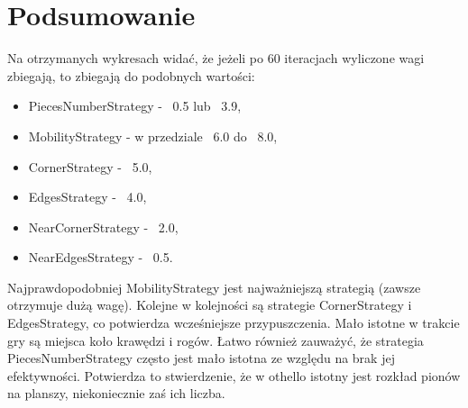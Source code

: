 \section{Podsumowanie} 

Na otrzymanych wykresach widać, że jeżeli po 60 iteracjach wyliczone wagi zbiegają, to zbiegają do podobnych wartości:
 \begin{itemize}
 \item PiecesNumberStrategy - ~0.5 lub ~3.9,
 \item MobilityStrategy - w przedziale ~6.0 do ~8.0,
 \item CornerStrategy - ~5.0,
 \item EdgesStrategy - ~4.0,
 \item NearCornerStrategy - ~2.0,
 \item NearEdgesStrategy - ~0.5.
\end{itemize}

Najprawdopodobniej MobilityStrategy jest najważniejszą strategią (zawsze otrzymuje dużą wagę). Kolejne w kolejności są strategie CornerStrategy i EdgesStrategy, co potwierdza wcześniejsze przypuszczenia. Mało istotne w trakcie gry są miejsca koło krawędzi i rogów. Łatwo również zauważyć, że strategia PiecesNumberStrategy często jest mało istotna ze względu na brak jej efektywności. Potwierdza to stwierdzenie, że w othello istotny jest rozkład pionów na planszy, niekoniecznie zaś ich liczba.